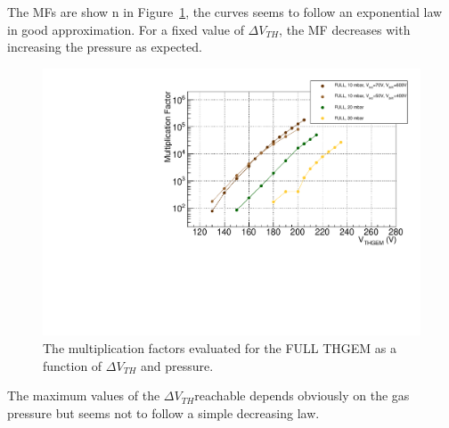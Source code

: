 \documentclass[a4paper, 11 pt]{report}
\newcommand{\Vthgem}{$\Delta V_{TH}$}
\begin{document}
The MFs are show	n in Figure~\ref{fig:multiplication_factor_FULL}, the curves seems to follow
an exponential law in good approximation.
For a fixed value of \Vthgem, the MF decreases with increasing the pressure as expected.
\begin{figure}[!t]
	\centering
	\includegraphics[width=\textwidth]{Immagini/MF_FULL_THGEM_noBeam.pdf}
	\caption{The multiplication factors evaluated for the FULL THGEM as a function of \Vthgem{} 
	and pressure.}
	\label{fig:multiplication_factor_FULL}
\end{figure}
The maximum values of the \Vthgem reachable depends obviously on the gas pressure but 
seems not to follow a simple decreasing law.

\clearpage
\end{document}
